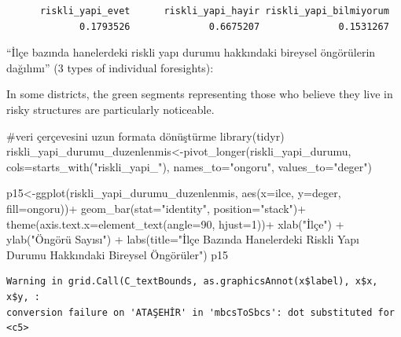 \documentclass[
  11pt,
  a4paper,
  DIV=11,
  numbers=noendperiod]{scrartcl}
\newenvironment{Shaded}{\begin{snugshade}}{\end{snugshade}}
\newcommand{\AttributeTok}[1]{\textcolor[rgb]{0.40,0.45,0.13}{#1}}
\newcommand{\CommentTok}[1]{\textcolor[rgb]{0.37,0.37,0.37}{#1}}
\newcommand{\DecValTok}[1]{\textcolor[rgb]{0.68,0.00,0.00}{#1}}
\newcommand{\FunctionTok}[1]{\textcolor[rgb]{0.28,0.35,0.67}{#1}}
\newcommand{\NormalTok}[1]{\textcolor[rgb]{0.00,0.23,0.31}{#1}}
\newcommand{\OtherTok}[1]{\textcolor[rgb]{0.00,0.23,0.31}{#1}}
\newcommand{\SpecialCharTok}[1]{\textcolor[rgb]{0.37,0.37,0.37}{#1}}
\newcommand{\StringTok}[1]{\textcolor[rgb]{0.13,0.47,0.30}{#1}}
\begin{document}
\begin{verbatim}
      riskli_yapi_evet      riskli_yapi_hayir riskli_yapi_bilmiyorum 
             0.1793526              0.6675207              0.1531267 
\end{verbatim}

``İlçe bazında hanelerdeki riskli yapı durumu hakkındaki bireysel
öngörülerin dağılımı'' (3 types of individual foresights):

In some districts, the green segments representing those who believe
they live in risky structures are particularly noticeable.

\begin{Shaded}
\begin{Highlighting}[]
\CommentTok{\#veri çerçevesini uzun formata dönüştürme}
\FunctionTok{library}\NormalTok{(tidyr)}
\NormalTok{riskli\_yapi\_durumu\_duzenlenmis}\OtherTok{\textless{}{-}}\FunctionTok{pivot\_longer}\NormalTok{(riskli\_yapi\_durumu, }\AttributeTok{cols=}\FunctionTok{starts\_with}\NormalTok{(}\StringTok{"riskli\_yapi\_"}\NormalTok{), }\AttributeTok{names\_to=}\StringTok{"ongoru"}\NormalTok{, }\AttributeTok{values\_to=}\StringTok{"deger"}\NormalTok{)}

\NormalTok{p15}\OtherTok{\textless{}{-}}\FunctionTok{ggplot}\NormalTok{(riskli\_yapi\_durumu\_duzenlenmis, }\FunctionTok{aes}\NormalTok{(}\AttributeTok{x=}\NormalTok{ilce, }\AttributeTok{y=}\NormalTok{deger, }\AttributeTok{fill=}\NormalTok{ongoru))}\SpecialCharTok{+}
  \FunctionTok{geom\_bar}\NormalTok{(}\AttributeTok{stat=}\StringTok{"identity"}\NormalTok{, }\AttributeTok{position=}\StringTok{"stack"}\NormalTok{)}\SpecialCharTok{+}
  \FunctionTok{theme}\NormalTok{(}\AttributeTok{axis.text.x=}\FunctionTok{element\_text}\NormalTok{(}\AttributeTok{angle=}\DecValTok{90}\NormalTok{, }\AttributeTok{hjust=}\DecValTok{1}\NormalTok{))}\SpecialCharTok{+}
  \FunctionTok{xlab}\NormalTok{(}\StringTok{"İlçe"}\NormalTok{) }\SpecialCharTok{+}
  \FunctionTok{ylab}\NormalTok{(}\StringTok{"Öngörü Sayısı"}\NormalTok{) }\SpecialCharTok{+}
  \FunctionTok{labs}\NormalTok{(}\AttributeTok{title=}\StringTok{"İlçe Bazında Hanelerdeki Riskli Yapı Durumu Hakkındaki Bireysel Öngörüler"}\NormalTok{)}
\NormalTok{p15}
\end{Highlighting}
\end{Shaded}

\begin{verbatim}
Warning in grid.Call(C_textBounds, as.graphicsAnnot(x$label), x$x, x$y, :
conversion failure on 'ATAŞEHİR' in 'mbcsToSbcs': dot substituted for <c5>
\end{verbatim}
\end{document}
